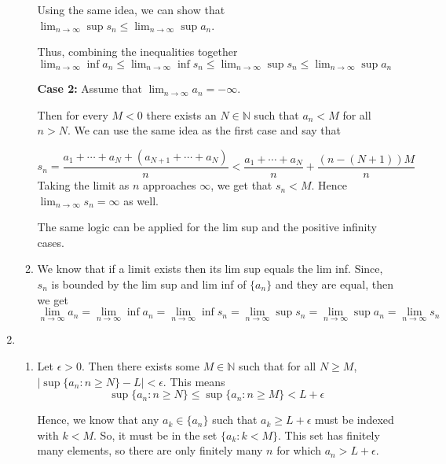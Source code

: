 \documentclass[12pt]{article}
\begin{document}
\begin{enumerate}[start=1,label={\bfseries Problem \arabic*:},leftmargin=1in]
\begin{enumerate}
        Using the same idea, we can show that $\lim_{n \to \infty} \sup s_{n} \leq \lim_{n \to \infty} \sup a_{n}$. 
    
        Thus, combining the inequalities together $\lim_{n \to \infty} \inf a_{n} \leq \lim_{n \to \infty} \inf s_{n} \leq \lim_{n \to \infty} \sup s_{n} \leq \lim_{n \to \infty} \sup a_{n}$
    
        \textbf{Case 2:} Assume that $\lim_{n \to \infty} a_{n} = -\infty$. 
    
        Then for every $M < 0$ there exists an $N \in \mathbb{N}$ such that $a_n < M$ for all $n > N$. 
        We can use the same idea as the first case and say that 
    
        \[ 
            s_{n} = \frac{a_{1} + \cdots + a_{N} + (a_{N+1} + \cdots + a_{N})}{n} < \frac{a_{1} + \cdots + a_{N}}{n} + \frac{(n - (N+1))M}{n}
        \]
        Taking the limit as $n$ approaches $\infty$, we get that $s_{n} < M$. Hence $\lim_{n \to \infty} s_{n} = \infty$ as well. 
    
        The same logic can be applied for the lim sup and the positive infinity cases.

        \item We know that if a limit exists then its lim sup equals the lim inf. Since, $s_{n}$ is bounded by the lim sup and lim inf of $\{a_{n}\}$ and they are equal, then we get 
        \[
            \lim_{n \to \infty} a_{n} = \lim_{n \to \infty} \inf a_{n} = \lim_{n \to \infty} \inf s_{n} = \lim_{n \to \infty} \sup s_{n} = \lim_{n \to \infty} \sup a_{n} = \lim_{n \to \infty} s_{n}
        \]
    \end{enumerate}
    
    \item \begin{enumerate}
        \item Let $\epsilon > 0$. Then there exists some $M \in \mathbb{N}$ such that for all $N \geq M$, $\left| \sup \{a_{n} : n \geq N\} - L\right| < \epsilon$. 
        This means \[ \sup \{ a_{n} : n \geq N\} \leq \sup  \{ a_{n} : n \geq M \} < L + \epsilon\]
        
        Hence, we know that any $a_{k} \in \{ a_{n} \}$ such that $a_{k} \geq L + \epsilon$ must be indexed with $k < M$. 
        So, it must be in the set $\{ a_{k} : k < M \}$. This set has finitely many elements, so there are only finitely many $n$ for which $a_{n} > L + \epsilon$.  
    

\end{enumerate}
\end{enumerate}
\end{document}
